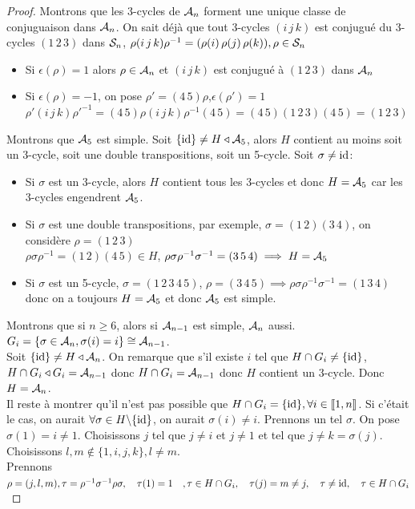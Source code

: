 \documentclass[]{report}
\begin{document}
    \begin{proof}
        Montrons que les 3-cycles de $\mathcal{A}_n$ forment une unique classe de conjuguaison dans $\mathcal{A}_n$. On sait déjà que tout 3-cycles $(i\,j\,k)$ est conjugué du 3-cycles $(1\,2\,3)$ dans $\mathcal{S}_n$, $\rho(i\,j\,k)\rho^{-1}=(\rho(i)\,\rho(j)\,\rho(k)),\rho\in\mathcal{S}_n$
        \begin{itemize}
            \item Si $\epsilon(\rho)=1$ alors $\rho\in\mathcal{A}_n$ et $(i\,j\,k)$ est conjugué à $(1\,2\,3)$ dans $\mathcal{A}_n$
            \item Si $\epsilon(\rho)=-1$, on pose $\rho'=(4\,5)\rho$,$\epsilon(\rho')=1$\\
            $\rho'(i\,j\,k){\rho'}^{-1}=(4\,5)\rho(i\,j\,k)\rho^{-1}(4\, 5)=(4\,5)(1\,2\,3)(4\,5)=(1\,2\,3)$\\
            \end{itemize}
        Montrons que $\mathcal{A}_5$ est simple. Soit $\{\text{id}\}\neq H\triangleleft\mathcal{A}_5$, alors $H$ contient au moins soit un 3-cycle, soit une double transpositions, soit un 5-cycle. Soit $\sigma\neq \text{id}$:
        \begin{itemize}
            \item Si $\sigma$ est un 3-cycle, alors $H$ contient tous les 3-cycles et donc $H=\mathcal{A}_5$ car les 3-cycles engendrent $\mathcal{A}_5$.
            \item Si $\sigma$ est une double transpositions, par exemple, $\sigma=(1\,2)(3\,4)$, on considère $\rho=(1\,2\,3)$\\
            $\rho\sigma\rho^{-1}=(1\,2)(4\,5)\in H$, $\rho\sigma\rho^{-1}\sigma^{-1}=(3\,5\,4)\implies H=\mathcal{A}_5$
            \item Si $\sigma$ est un 5-cycle, $\sigma=(1\,2\,3\,4\,5)$, $\rho=(3\,4\,5)\implies \rho\sigma\rho^{-1}\sigma^{-1}=(1\,3\,4)$ donc on a toujours $H=\mathcal{A}_5$ et donc $\mathcal{A}_5$ est simple.
        \end{itemize}
        Montrons que si $n\ge 6$, alors si $\mathcal{A}_{n-1}$ est simple, $\mathcal{A}_n$ aussi. $G_i=\{\sigma\in\mathcal{A}_n,\sigma(i)=i\}\cong \mathcal{A}_{n-1}$.\\
        Soit $\{\text{id}\}\neq H\triangleleft\mathcal{A}_n$. On remarque que s'il existe $i$ tel que $H\cap G_i\neq \{\text{id}\}$, $H\cap G_i\triangleleft G_i=\mathcal{A}_{n-1}$ donc $H\cap G_i=\mathcal{A}_{n-1}$ donc $H$ contient un 3-cycle. Donc $H=\mathcal{A}_n$.\\
        Il reste à montrer qu'il n'est pas possible que $H\cap G_i=\{\text{id}\},\forall i\in\llbracket1,n\rrbracket$. Si c'était le cas, on aurait $\forall \sigma\in H\backslash\{\text{id}\}$, on aurait $\sigma(i)\neq i$. Prennons un tel $\sigma$. On pose $\sigma(1)=i\neq 1$. Choisissons $j$ tel que $j\neq i$ et $j\neq 1$ et tel que $j\neq k=\sigma(j)$. Choisissons $l,m\not\in\{1,i,j,k\},l\neq m$.\\
        Prennons $\rho=(j,l,m),\tau=\rho^{-1}\sigma^{-1}\rho\sigma,\quad \tau(1)=1\quad,\tau\in H\cap G_i,\quad \tau(j)=m\neq j,\quad \tau\neq\text{id},\quad \tau\in H\cap G_i$
    \end{proof}
\end{document}
